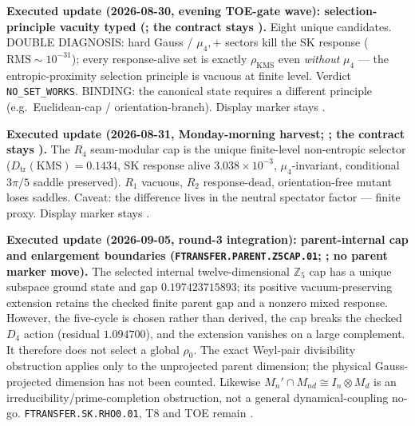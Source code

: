 \par\smallskip\noindent\textbf{Executed update (2026-08-30, evening TOE-gate wave): selection-principle
vacuity typed
(; the contract stays \mO).}
Eight unique candidates.  DOUBLE DIAGNOSIS: hard Gauss / $\mu_4,+$ sectors kill the SK response
($\mathrm{RMS}\sim10^{-31}$); every response-alive set is exactly $\rho_{\mathrm{KMS}}$ even
\emph{without} $\mu_4$ --- the entropic-proximity selection principle is vacuous at finite level.
Verdict \texttt{NO\_SET\_WORKS}.  BINDING: the canonical state requires a different principle
(e.g.\ Euclidean-cap / orientation-branch).  Display marker stays \mO.

\par\smallskip\noindent\textbf{Executed update (2026-08-31, Monday-morning harvest;
;
the contract stays \mO).}
The $R_4$ seam-modular cap is the unique finite-level non-entropic selector
($D_{\mathrm{tr}}(\mathrm{KMS})=0.1434$, SK response alive $3.038{\times}10^{-3}$,
$\mu_4$-invariant, conditional $3\pi/5$ saddle preserved).  $R_1$ vacuous, $R_2$
response-dead, orientation-free mutant loses saddles.  Caveat: the difference lives
in the neutral spectator factor --- finite proxy.  Display marker stays \mO.

\par\smallskip\noindent\textbf{Executed update (2026-09-05, round-3 integration):
parent-internal cap and enlargement boundaries
(\texttt{FTRANSFER.PARENT.Z5CAP.01};
; no parent
marker move).}
The selected internal twelve-dimensional $\mathbb Z_5$ cap has a unique subspace
ground state and gap $0.197423715893$; its positive vacuum-preserving extension retains
the checked finite parent gap and a nonzero mixed response.  However, the five-cycle is
chosen rather than derived, the cap breaks the checked $D_4$ action (residual
$1.094700$), and the extension vanishes on a large complement.  It therefore does not
select a global $\rho_0$.  The exact Weyl-pair divisibility obstruction applies only to
the unprojected parent dimension; the physical Gauss-projected dimension has not been
counted.  Likewise
$M_n'\cap M_{nd}\cong I_n\otimes M_d$ is an irreducibility/prime-completion obstruction,
not a general dynamical-coupling no-go.  \texttt{FTRANSFER.SK.RHO0.01}, T8 and TOE
remain \mO.

